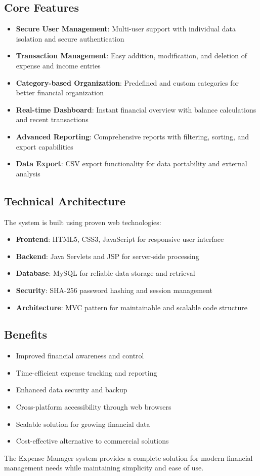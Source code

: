 \subsection{Core Features}
\begin{itemize}
    \item \textbf{Secure User Management}: Multi-user support with individual data isolation and secure authentication
    \item \textbf{Transaction Management}: Easy addition, modification, and deletion of expense and income entries
    \item \textbf{Category-based Organization}: Predefined and custom categories for better financial organization
    \item \textbf{Real-time Dashboard}: Instant financial overview with balance calculations and recent transactions
    \item \textbf{Advanced Reporting}: Comprehensive reports with filtering, sorting, and export capabilities
    \item \textbf{Data Export}: CSV export functionality for data portability and external analysis
\end{itemize}

\subsection{Technical Architecture}
The system is built using proven web technologies:
\begin{itemize}
    \item \textbf{Frontend}: HTML5, CSS3, JavaScript for responsive user interface
    \item \textbf{Backend}: Java Servlets and JSP for server-side processing
    \item \textbf{Database}: MySQL for reliable data storage and retrieval
    \item \textbf{Security}: SHA-256 password hashing and session management
    \item \textbf{Architecture}: MVC pattern for maintainable and scalable code structure
\end{itemize}

\subsection{Benefits}
\begin{itemize}
    \item Improved financial awareness and control
    \item Time-efficient expense tracking and reporting
    \item Enhanced data security and backup
    \item Cross-platform accessibility through web browsers
    \item Scalable solution for growing financial data
    \item Cost-effective alternative to commercial solutions
\end{itemize}

The Expense Manager system provides a complete solution for modern financial management needs while maintaining simplicity and ease of use.